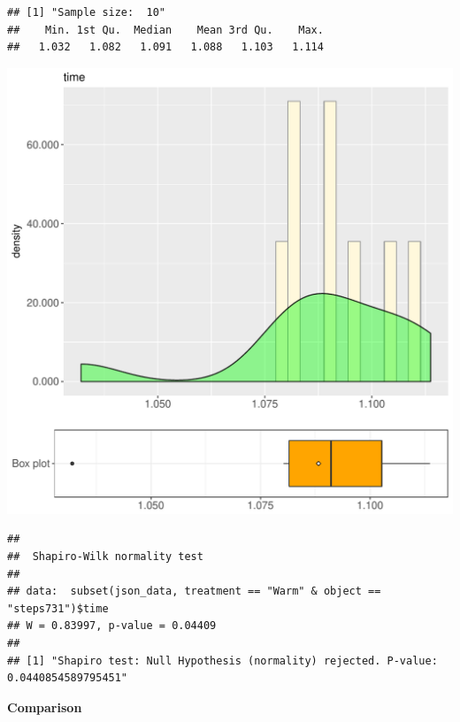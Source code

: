 \documentclass{article}\usepackage[]{graphicx}\usepackage[]{color}
\makeatletter
\def\maxwidth{ %
  \ifdim\Gin@nat@width>\linewidth
    \linewidth
  \else
    \Gin@nat@width
  \fi
}
\newenvironment{kframe}{%
 \def\at@end@of@kframe{}%
 \ifinner\ifhmode%
  \def\at@end@of@kframe{\end{minipage}}%
  \begin{minipage}{\columnwidth}%
 \fi\fi%
 \def\FrameCommand##1{\hskip\@totalleftmargin \hskip-\fboxsep
 \colorbox{shadecolor}{##1}\hskip-\fboxsep
     \hskip-\linewidth \hskip-\@totalleftmargin \hskip\columnwidth}%
 \MakeFramed {\advance\hsize-\width
   \@totalleftmargin\z@ \linewidth\hsize
   \@setminipage}}%
 {\par\unskip\endMakeFramed%
 \at@end@of@kframe}
\newenvironment{knitrout}{}{} %
\makeatother
\begin{document}
\begin{knitrout}
\color{fgcolor}\begin{kframe}
\begin{verbatim}
## [1] "Sample size:  10"
##    Min. 1st Qu.  Median    Mean 3rd Qu.    Max. 
##   1.032   1.082   1.091   1.088   1.103   1.114
\end{verbatim}
\end{kframe}
\includegraphics[width=\maxwidth]{figure/RH1_Warm_steps731-1} 
\begin{kframe}\begin{verbatim}
## 
## 	Shapiro-Wilk normality test
## 
## data:  subset(json_data, treatment == "Warm" & object == "steps731")$time
## W = 0.83997, p-value = 0.04409
## 
## [1] "Shapiro test: Null Hypothesis (normality) rejected. P-value: 0.0440854589795451"
\end{verbatim}
\end{kframe}
\end{knitrout}
  
 \textbf{Comparison}
  
\end{document}

